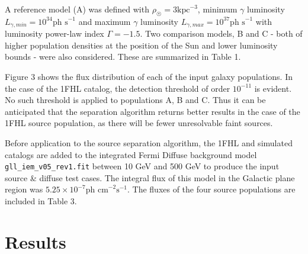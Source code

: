 \documentclass{PoS}
\begin{document}
A reference model (A) was defined with $\rho_{\astrosun} = 3 \text{kpc}^{-3}$, minimum $\gamma$ luminosity $L_{\gamma, min} = 10^{34} \text{ph s}^{-1}$ and maximum $\gamma$ luminosity $L_{\gamma, max} = 10^{37} \text{ph s}^{-1}$ with luminosity power-law index $\Gamma=-1.5$. Two comparison models, B and C - both of higher population densities at the position of the Sun and lower luminosity bounds - were also considered. These are summarized in Table 1.

Figure 3 shows the flux distribution of each of the input galaxy populations. In the case of the 1FHL catalog, the detection threshold of order $10^{-11}$ is evident. No such threshold is applied to populations A, B and C. Thus it can be anticipated that the separation algorithm returns better results in the case of the 1FHL source population, as there will be fewer unresolvable faint sources.

\begin{table}
\centering
{}
\caption{Parameters for 10 - 500 GeV Galaxy Population Simulations.}
\vspace{-20pt}
\end{table}

Before application to the source separation algorithm, the 1FHL and simulated catalogs are added to the integrated Fermi Diffuse background model \verb|gll_iem_v05_rev1.fit| between 10 GeV and 500 GeV to produce the input source \& diffuse test cases. The integral flux of this model in the Galactic plane region was $5.25 \times 10^{-7} \text{ph cm}^{-2}\text{s}^{-1}$. The fluxes of the four source populations are included in Table 3.

\section{Results}
\end{document}
